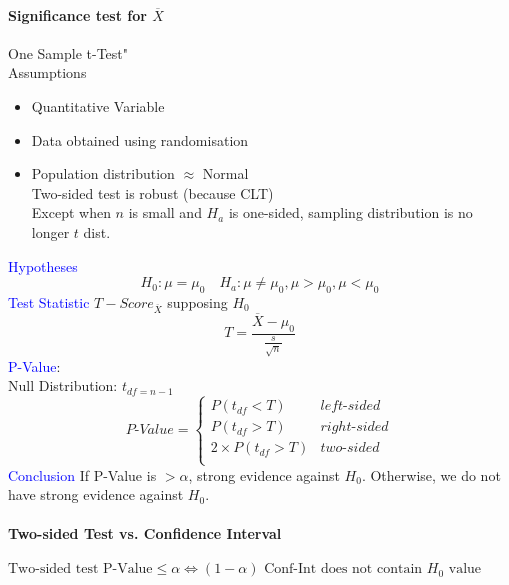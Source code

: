 \paragraph{Significance test for $\overline{X}$}
\dq One Sample t-Test"\\
\textcolor{Bittersweet}{Assumptions}
\begin{itemize}
	\item Quantitative Variable
	\item Data obtained using randomisation
	\item Population distribution $\approx$ Normal\\
		Two-sided test is robust (because CLT)\\
		Except when $n$ is small and $H_a$ is one-sided, sampling distribution is no longer $t$ dist.
\end{itemize}
\textcolor{Blue}{Hypotheses}
\[H_0:\mu=\mu_0\quad H_a:\mu\neq \mu_0, \mu>\mu_0, \mu<\mu_0\]
\textcolor{Blue}{Test Statistic}
$T-Score_{\overline{X}}$ supposing $H_0$
\[T=\frac{\overline{X}-\mu_0}{\frac{s}{\sqrt{n}}}\]
\textcolor{Blue}{P-Value}:\\
Null Distribution: $t_{df=n-1}$
\[ P\text{-}Value=\begin{cases}
	P(t_{df}<T)&left\text{-}sided\\
	P(t_{df}>T)&right\text{-}sided\\
	2\times P(t_{df}>T)&two\text{-}sided\\
\end{cases}
\]
\textcolor{Blue}{Conclusion}
If P-Value is $>\alpha$, strong evidence against $H_0$. Otherwise, we do not have strong evidence against $H_0$.
\paragraph{Two-sided Test vs. Confidence Interval}
$\text{Two-sided test P-Value}\le \alpha\iff(1-\alpha)\text{ Conf-Int does not contain }H_0\text{ value}$